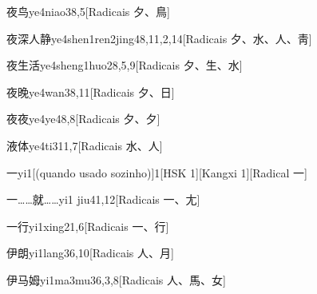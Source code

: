 \begin{entry}{夜鸟}{ye4niao3}{8,5}[Radicais ⼣、⿃]
\end{entry}

\begin{entry}{夜深人静}{ye4shen1ren2jing4}{8,11,2,14}[Radicais ⼣、⽔、⼈、⾭]
\end{entry}

\begin{entry}{夜生活}{ye4sheng1huo2}{8,5,9}[Radicais ⼣、⽣、⽔]
\end{entry}

\begin{entry}{夜晚}{ye4wan3}{8,11}[Radicais ⼣、⽇]
\end{entry}

\begin{entry}{夜夜}{ye4ye4}{8,8}[Radicais ⼣、⼣]
\end{entry}

\begin{entry}{液体}{ye4ti3}{11,7}[Radicais ⽔、⼈]
\end{entry}

\begin{entry}{一}{yi1}[(quando usado sozinho)]{1}[HSK 1][Kangxi 1][Radical ⼀]
\end{entry}

\begin{entry}{一……就……}{yi1 jiu4}{1,12}[Radicais ⼀、⼪]
\end{entry}

\begin{entry}{一行}{yi1xing2}{1,6}[Radicais ⼀、⾏]
\end{entry}

\begin{entry}{伊朗}{yi1lang3}{6,10}[Radicais ⼈、⽉]
\end{entry}

\begin{entry}{伊马姆}{yi1ma3mu3}{6,3,8}[Radicais ⼈、⾺、⼥]
\end{entry}

